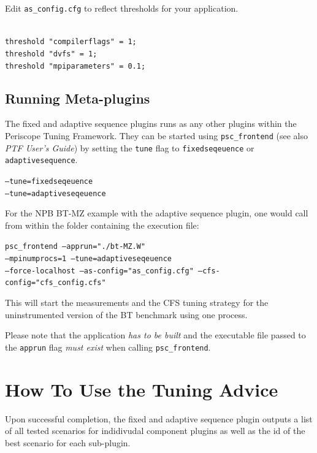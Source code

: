 \documentclass[11pt,a4paper, oneside]{book} %
\newenvironment{code}%
{
\addtolength{\leftskip}{0.5cm}}%
{

}
\begin{document}
Edit \texttt{as\_config.cfg} to reflect thresholds for your application. 

\begin{code}
\texttt{\\
threshold "compilerflags" = 1; \\
threshold "dvfs" = 1; \\
threshold "mpiparameters" = 0.1; \\}
\end{code}

\section{Running Meta-plugins}
The fixed and adaptive sequence plugins runs as any other plugins within the Periscope Tuning Framework. They can be started using \texttt{psc\_frontend} (see also \textit{PTF User's Guide}) by setting the \texttt{tune} flag to \texttt{fixedseqeuence} or \texttt{adaptivesequence}.

\begin{code}
\texttt{--tune=fixedseqeuence}\\
\texttt{--tune=adaptiveseqeuence}
\end{code}

For the NPB BT-MZ example with the adaptive sequence plugin, one would call from within the folder containing the execution file:
\vspace*{0.5cm}

\begin{center}
\begin{minipage}{0.8\textwidth}
\texttt{psc\_frontend --apprun="./bt-MZ.W" \\
--mpinumprocs=1 --tune=adaptiveseqeuence \\
--force-localhost --as-config="as\_config.cfg" --cfs-config="cfs\_config.cfs"}
\end{minipage}
\end{center}

\vspace*{0.5cm}
This will start the measurements and the CFS tuning strategy for the uninstrumented version of the BT benchmark using one process.

Please note that the application \textit{has to be built} and the executable file passed to the \texttt{apprun} flag \textit{must exist} when calling \texttt{psc\_frontend}.

\chapter{How To Use the Tuning Advice}
Upon successful completion, the fixed and adaptive sequence plugin outputs a list of all tested scenarios for indidivudal component plugins as well as the id of the best scenario for each sub-plugin.
\end{document}
